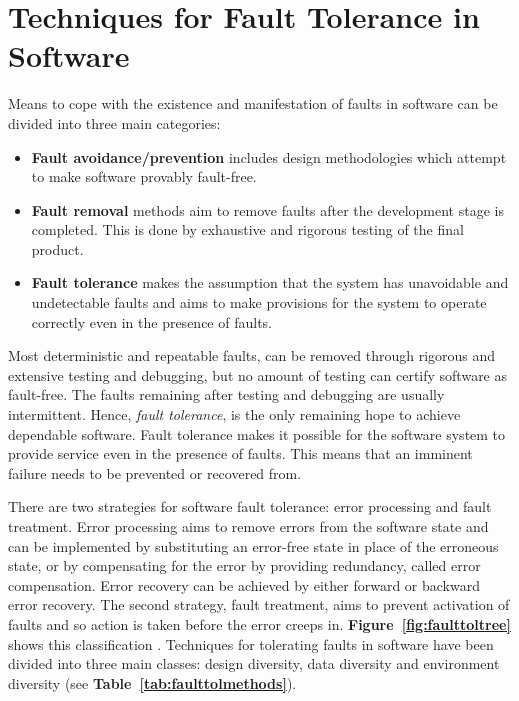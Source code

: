 \documentclass[oneside, a4paper, 11pt]{memoir}
\begin{document}
\section{Techniques for Fault Tolerance in Software}
Means to cope with the existence and manifestation of faults in software can be divided into three main categories:

\begin{itemize}
\item \textbf{Fault avoidance/prevention} includes design methodologies which attempt to make software provably fault-free.
\item \textbf{Fault removal} methods aim to remove faults after the development stage is completed. This is done by exhaustive and rigorous testing of the final product.
\item \textbf{Fault tolerance} makes the assumption that the system has unavoidable and undetectable faults and aims to make provisions for the system to operate correctly even in the presence of faults.
\end{itemize}

Most deterministic and repeatable faults, can be removed through rigorous and extensive testing and debugging, but no amount of testing can certify software as fault-free. The faults remaining after testing and debugging are usually intermittent. Hence, \emph{fault tolerance}, is the only remaining hope to achieve dependable software. Fault tolerance makes it possible for the software system to provide service even in the presence of faults. This means that an imminent failure needs to be prevented or recovered from.

There are two strategies for software fault tolerance: error processing and fault treatment. Error processing aims to remove errors from the software state and can be implemented by substituting an error-free state in place of the erroneous state, or by compensating for the error by providing redundancy, called error compensation. Error recovery can be achieved by either forward or backward error recovery. The second strategy, fault treatment, aims to prevent activation of faults and so action is taken before the error creeps in. \textbf{Figure~\ref{fig:faulttoltree}} shows this classification \citep{trivedi2008software}. Techniques for tolerating faults in software have been divided into three main classes: design diversity, data diversity and environment diversity (see \textbf{Table~\ref{tab:faulttolmethods}}).
\end{document}

